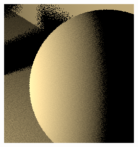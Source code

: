\begin{figure}[h!]
{\begin{minipage}{\dimexpr .33\textwidth-\fboxsep-2\fboxrule}
\begin{subfigure}{\textwidth}
            \includegraphics[width=\textwidth]{imagenes/rect91}
            \vspace{0.2cm}


\end{subfigure}
\end{minipage}}
\end{figure}

